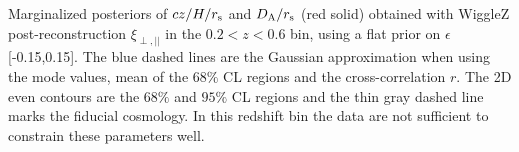 \label{fig:HDA_z26_epsilon0.15} Marginalized posteriors of $cz/H/r_{\rm s}$ and $D_{\rm A}/r_{\rm s}$ (red solid) obtained with WiggleZ post-reconstruction $\xi_{\perp, ||}$ in the $0.2<z<0.6$ bin, using a flat prior on $\epsilon$ [-0.15,0.15]. The blue dashed lines are the Gaussian approximation when using the mode values, mean of the 68$\%$ CL regions and the cross-correlation $r$. The 2D even contours are the $68\%$ and $95\%$ CL regions and the thin gray dashed line marks the fiducial cosmology.  In this redshift bin the data are not sufficient to constrain these parameters well. 